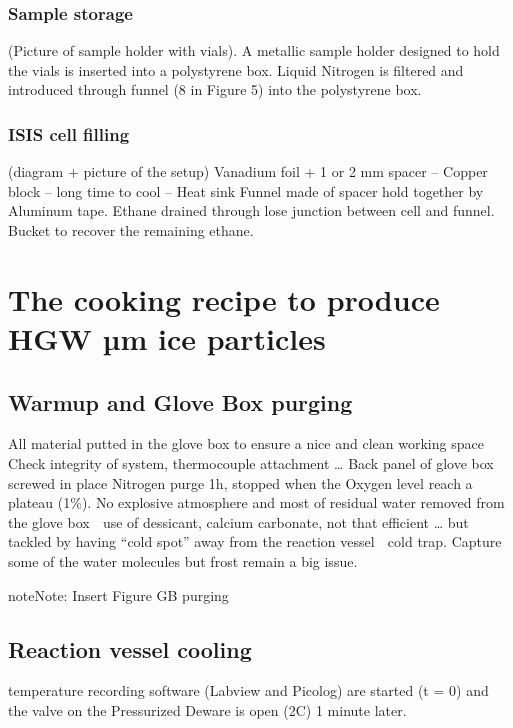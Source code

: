 \documentclass[letterpaper,10pt,english]{jupyterBook}
\begin{document}
\subsubsection{Sample storage}
\label{\detokenize{Chapter7/Chapter7:sample-storage}}
\sphinxAtStartPar
(Picture of sample holder with vials).
A metallic sample holder designed to hold the vials is inserted into a polystyrene box. Liquid Nitrogen is filtered and introduced through funnel (8 in Figure 5) into the polystyrene box.


\subsubsection{ISIS cell filling}
\label{\detokenize{Chapter7/Chapter7:isis-cell-filling}}
\sphinxAtStartPar
(diagram + picture of the setup)
Vanadium foil + 1 or 2 mm spacer –
Copper block – long time to cool – Heat sink
Funnel made of spacer hold together by Aluminum tape.
Ethane drained through lose junction between cell and funnel.
Bucket to recover the remaining ethane.


\section{The cooking recipe to produce HGW µm ice particles}
\label{\detokenize{Chapter7/Chapter7:the-cooking-recipe-to-produce-hgw-m-ice-particles}}

\subsection{Warm\sphinxhyphen{}up and Glove Box purging}
\label{\detokenize{Chapter7/Chapter7:warm-up-and-glove-box-purging}}
\sphinxAtStartPar
All material putted in the glove box to ensure a nice and clean working space
Check integrity of system, thermocouple attachment …
Back panel of glove box screwed in place
Nitrogen purge 1h, stopped when the Oxygen level reach a plateau (1\%). No explosive atmosphere and most of residual water removed from the glove box  use of dessicant, calcium carbonate, not that efficient … but tackled by having “cold spot” away from the reaction vessel  cold trap. Capture some of the water molecules but frost remain a big issue.

\begin{sphinxadmonition}{note}{Note:}
\sphinxAtStartPar
Insert Figure GB purging
\end{sphinxadmonition}


\subsection{Reaction vessel cooling}
\label{\detokenize{Chapter7/Chapter7:reaction-vessel-cooling}}
 temperature recording software (Labview and Picolog) are started (t = 0) and the valve on the Pressurized Deware is open (2C) 1 minute later.
\end{document}
